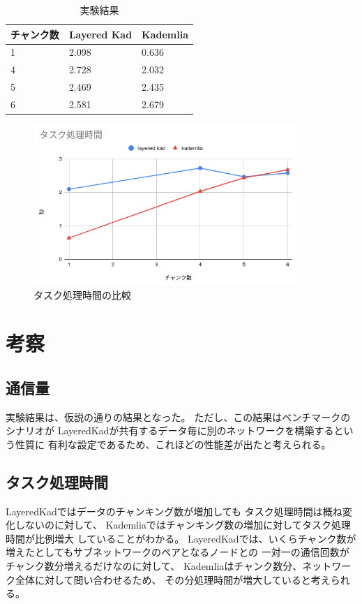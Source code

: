 \documentclass[sotsuron]{jcsie}
\begin{document}
\begin{table}[H]
	\caption{実験結果}	
	\centering
	\label{table:calc-result}
	\begin{tabular}{|l|l|l|}
		\hline
		チャンク数 &   
		Layered Kad     &   
		Kademlia\\ 
		\hline
		1               &   
		2.098           &   
		0.636\\
		\hline
		4               &   
		2.728           &   
		2.032\\
		\hline
		5               &   
		2.469           &   
		2.435\\
		\hline
		6               &   
		2.581           &   
		2.679\\
		\hline
	\end{tabular}	
\end{table}

\begin{figure}[H]
	\centering
	\includegraphics[width=10cm]{./assets/image/calc_compare.png}
	\caption{タスク処理時間の比較}
	\label{fig:calc_compare.png}
\end{figure}

\section{考察}
\subsection{通信量}
実験結果は、仮説の通りの結果となった。
ただし、この結果はベンチマークのシナリオが
LayeredKadが共有するデータ毎に別のネットワークを構築するという性質に
有利な設定であるため、これほどの性能差が出たと考えられる。
\subsection{タスク処理時間}
LayeredKadではデータのチャンキング数が増加しても
タスク処理時間は概ね変化しないのに対して、
Kademliaではチャンキング数の増加に対してタスク処理時間が比例増大
していることがわかる。
LayeredKadでは、いくらチャンク数が増えたとしてもサブネットワークのペアとなるノードとの
一対一の通信回数がチャンク数分増えるだけなのに対して、
Kademliaはチャンク数分、ネットワーク全体に対して問い合わせるため、
その分処理時間が増大していると考えられる。
\end{document}
